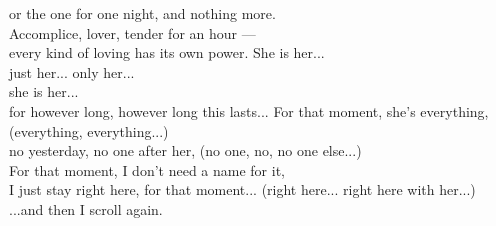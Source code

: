\begin{lyrics}
or the one for one night, and nothing more.\\
Accomplice, lover, tender for an hour —\\
every kind of loving has its own power.
She is her...\\
just her... only her...\\
she is her...\\
for however long, however long this lasts...
For that moment, she's everything,
(everything, everything...)\\
no yesterday, no one after her,
(no one, no, no one else...)\\
For that moment, I don't need a name for it,\\
I just stay right here, for that moment...
(right here... right here with her...)
...and then I scroll again.
\end{lyrics}

